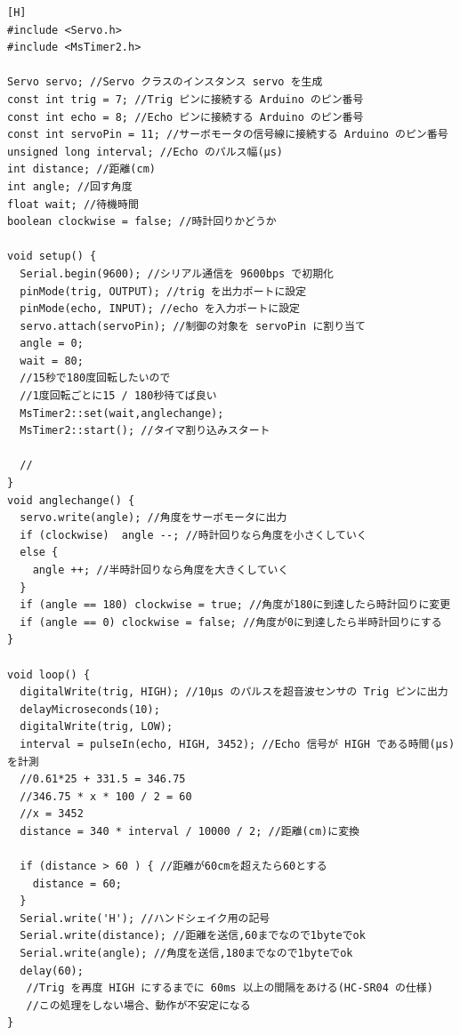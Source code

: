 \documentclass{jarticle}
\begin{document}
\begin{lstlisting}[caption = 課題7.2.1(Arduino),label=code:kadai7-2-1-a][H]
#include <Servo.h>
#include <MsTimer2.h>

Servo servo; //Servo クラスのインスタンス servo を生成
const int trig = 7; //Trig ピンに接続する Arduino のピン番号
const int echo = 8; //Echo ピンに接続する Arduino のピン番号
const int servoPin = 11; //サーボモータの信号線に接続する Arduino のピン番号
unsigned long interval; //Echo のパルス幅(μs)
int distance; //距離(cm)
int angle; //回す角度
float wait; //待機時間
boolean clockwise = false; //時計回りかどうか

void setup() {
  Serial.begin(9600); //シリアル通信を 9600bps で初期化
  pinMode(trig, OUTPUT); //trig を出力ポートに設定
  pinMode(echo, INPUT); //echo を入力ポートに設定
  servo.attach(servoPin); //制御の対象を servoPin に割り当て
  angle = 0;
  wait = 80;
  //15秒で180度回転したいので
  //1度回転ごとに15 / 180秒待てば良い
  MsTimer2::set(wait,anglechange);
  MsTimer2::start(); //タイマ割り込みスタート

  // 
}
void anglechange() {
  servo.write(angle); //角度をサーボモータに出力
  if (clockwise)  angle --; //時計回りなら角度を小さくしていく
  else {
    angle ++; //半時計回りなら角度を大きくしていく
  }
  if (angle == 180) clockwise = true; //角度が180に到達したら時計回りに変更
  if (angle == 0) clockwise = false; //角度が0に到達したら半時計回りにする
}

void loop() {
  digitalWrite(trig, HIGH); //10μs のパルスを超音波センサの Trig ピンに出力
  delayMicroseconds(10);
  digitalWrite(trig, LOW);
  interval = pulseIn(echo, HIGH, 3452); //Echo 信号が HIGH である時間(μs)を計測
  //0.61*25 + 331.5 = 346.75
  //346.75 * x * 100 / 2 = 60
  //x = 3452
  distance = 340 * interval / 10000 / 2; //距離(cm)に変換
  
  if (distance > 60 ) { //距離が60cmを超えたら60とする
    distance = 60;
  } 
  Serial.write('H'); //ハンドシェイク用の記号
  Serial.write(distance); //距離を送信,60までなので1byteでok
  Serial.write(angle); //角度を送信,180までなので1byteでok
  delay(60);
   //Trig を再度 HIGH にするまでに 60ms 以上の間隔をあける(HC-SR04 の仕様)
   //この処理をしない場合、動作が不安定になる
}
\end{lstlisting}
\end{document}
